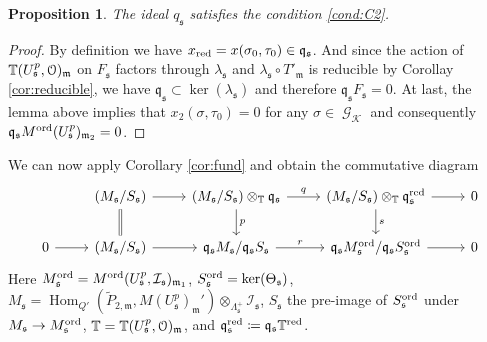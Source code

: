 \documentclass[leqno]{amsart}
\newtheorem{prop}[thm]{Proposition}
\theoremstyle{definition}
\theoremstyle{remark}
\newcommand{\eo}{\EuScript{O}}
\DeclareMathOperator{\Hom}{Hom}
\DeclareMathOperator{\Gal}{\mathcal{G}}
\newcommand{\fm}{\mathfrak{m}}
\newcommand{\fq}{\mathfrak{q}}
\newcommand{\fs}{\mathfrak{s}}
\newcommand{\red}{\textnormal{red}}
\newcommand{\xx}{x_\textnormal{red}}
\newcommand{\K}{{\mathcal{K}}} %
\newcommand{\TT}{\mathbb{T}} %
\newcommand{\I}{\mathcal{I}} %
\newcommand{\ord}{\textnormal{ord}} %
\begin{document}
\begin{prop}
The ideal  $q_{\fs}$
satisfies the condition \ref{cond:C2}.
\end{prop}

\begin{proof}

By definition we have $\xx=x(\sigma_0,\tau_0)\in \fq_\fs$.
And since the action of $\TT(U^p_\fs,\eo)_\fm$
on $F_\fs$ factors through $\lambda_\fs$
and $\lambda_\fs\circ T'_\fm$ is reducible 
by Corollay \ref{cor:reducible},
we have $\fq_\fs\subset \ker(\lambda_\fs)$ and 
therefore $\fq_\fs F_\fs=0$.
At last, the lemma above
implies that $x_2(\sigma, \tau_0)=0$
for any $\sigma\in\Gal_\K$
and consequently
$\fq_\fs M^{\ord}(U^p_\fs)_{\fm_2}=0$.
\end{proof}


We can now apply Corollary \ref{cor:fund}
and obtain the commutative diagram
\begin{equation}\label{eq:comm_s}
    \begin{tikzcd}
    & (M_\fs/S_\fs)
    \arrow[r]\arrow[d,equal] &
    (M_\fs/S_\fs)\otimes_{\TT}\fq_\fs
    \arrow[r,"q"]\arrow[d,"p"] &
    (M_\fs/S_\fs)\otimes_{\TT}\fq_\fs^\red
    \arrow[r]\arrow[d,"s"] &0\\
    0\arrow[r] &
    (M_\fs/S_\fs)
    \arrow[r] &
    \fq_\fs M_\fs/\fq_\fs S_\fs
    \arrow[r,"r"] &
    \fq_\fs M^{\ord}_{\fs}/\fq_\fs S^{\ord}_{\fs}
    \arrow[r] &0
    \end{tikzcd}
\end{equation}
Here
$M^{\ord}_{\fs}=M^{\ord}(U^p_\fs,\I_\fs)_{\fm_1}$,
$S^{\ord}_{\fs}=\ker(\Theta_\fs)$,
$M_\fs=\Hom_{Q'}(\tilde{P}_{2,\fm},M(U^p_\fs)_{\fm}')
\otimes_{\Lambda_{\fs}^+}\I_\fs$,
$S_\fs$ the pre-image of $S^{\ord}_\fs$
under $M_\fs\to M^{\ord}_\fs$,
$\TT=\TT(U^p_\fs,\eo)_\fm$, and
$\fq_\fs^\red\coloneqq\fq_\fs\TT^{\red}$.
\end{document}
